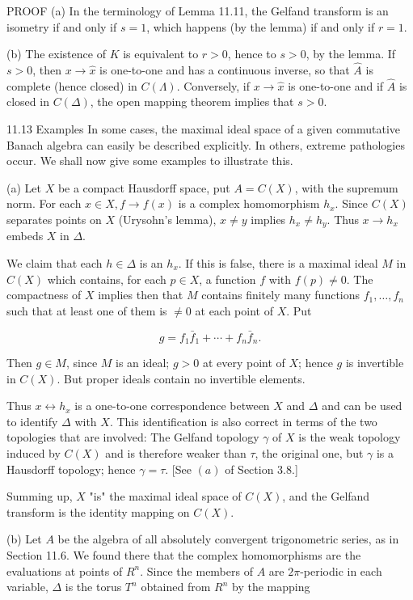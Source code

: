 \documentclass[10pt]{article}
\begin{document}
PROOF (a) In the terminology of Lemma 11.11, the Gelfand transform is an isometry if and only if $s=1$, which happens (by the lemma) if and only if $r=1$.

(b) The existence of $K$ is equivalent to $r>0$, hence to $s>0$, by the lemma. If $s>0$, then $x \rightarrow \hat{x}$ is one-to-one and has a continuous inverse, so that $\hat{A}$ is complete (hence closed) in $C(\Lambda)$. Conversely, if $x \rightarrow \hat{x}$ is one-to-one and if $\widehat{A}$ is closed in $C(\Delta)$, the open mapping theorem implies that $s>0$.

11.13 Examples In some cases, the maximal ideal space of a given commutative Banach algebra can easily be described explicitly. In others, extreme pathologies occur. We shall now give some examples to illustrate this.

(a) Let $X$ be a compact Hausdorff space, put $A=C(X)$, with the supremum norm. For each $x \in X, f \rightarrow f(x)$ is a complex homomorphism $h_{x}$. Since $C(X)$ separates points on $X$ (Urysohn's lemma), $x \neq y$ implies $h_{x} \neq h_{y}$. Thus $x \rightarrow h_{x}$ embeds $X$ in $\Delta$.

We claim that each $h \in \Delta$ is an $h_{x}$. If this is false, there is a maximal ideal $M$ in $C(X)$ which contains, for each $p \in X$, a function $f$ with $f(p) \neq 0$. The compactness of $X$ implies then that $M$ contains finitely many functions $f_{1}, \ldots, f_{n}$ such that at least one of them is $\neq 0$ at each point of $X$. Put

$$
g=f_{1} \bar{f}_{1}+\cdots+f_{n} \bar{f}_{n} .
$$

Then $g \in M$, since $M$ is an ideal; $g>0$ at every point of $X$; hence $g$ is invertible in $C(X)$. But proper ideals contain no invertible elements.

Thus $x \leftrightarrow h_{x}$ is a one-to-one correspondence between $X$ and $\Delta$ and can be used to identify $\Delta$ with $X$. This identification is also correct in terms of the two topologies that are involved: The Gelfand topology $\gamma$ of $X$ is the weak topology induced by $C(X)$ and is therefore weaker than $\tau$, the original one, but $\gamma$ is a Hausdorff topology; hence $\gamma=\tau$. [See $(a)$ of Section 3.8.]

Summing up, $X$ "is" the maximal ideal space of $C(X)$, and the Gelfand transform is the identity mapping on $C(X)$.

(b) Let $A$ be the algebra of all absolutely convergent trigonometric series, as in Section 11.6. We found there that the complex homomorphisms are the evaluations at points of $R^{n}$. Since the members of $A$ are $2 \pi$-periodic in each variable, $\Delta$ is the torus $T^{n}$ obtained from $R^{n}$ by the mapping
\end{document}
